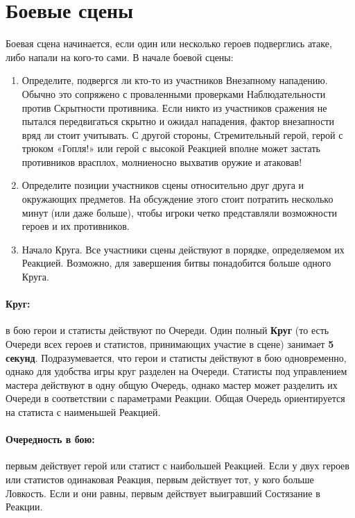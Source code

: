 \section{Боевые сцены}
Боевая сцена начинается, если один или несколько героев подверглись атаке, либо напали на кого-то сами. В начале боевой сцены:
\begin{enumerate}
\item Определите, подвергся ли кто-то из участников Внезапному нападению. Обычно это сопряжено с проваленными проверками Наблюдательности против Скрытности противника. Если никто из участников сражения не пытался передвигаться скрытно и ожидал нападения, фактор внезапности вряд ли стоит учитывать. С другой стороны, Стремительный герой, герой с трюком «Гопля!» или герой с высокой Реакцией вполне может застать противников врасплох, молниеносно выхватив оружие и атаковав!
\item Определите позиции участников сцены относительно друг друга и окружающих предметов. На обсуждение этого стоит потратить несколько минут (или даже больше), чтобы игроки четко представляли возможности героев и их противников.
\item Начало Круга. Все участники сцены действуют в порядке, определяемом их Реакцией. Возможно, для завершения битвы понадобится больше одного Круга.
\end{enumerate}
\paragraph{Круг:} в бою герои и статисты действуют по Очереди. Один полный \textbf{Круг} (то есть Очереди всех героев и статистов, принимающих участие в сцене) занимает \textbf{5 секунд}. Подразумевается, что герои и статисты действуют в бою одновременно, однако для удобства игры круг разделен на Очереди. Статисты под управлением мастера действуют в одну общую Очередь, однако мастер может разделить их Очереди в соответствии с параметрами Реакции. Общая Очередь ориентируется на статиста с наименьшей Реакцией.
\paragraph{Очередность в бою:} первым действует герой или статист с наибольшей Реакцией. Если у двух героев или статистов одинаковая Реакция, первым действует тот, у кого больше Ловкость. Если и они равны, первым действует выигравший Состязание в Реакции.
